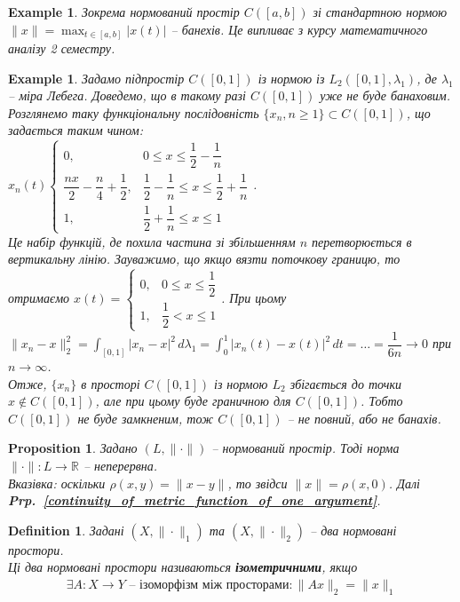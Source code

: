 \documentclass[a4paper, 10pt]{article}
\theoremstyle{theoremdd}
\theoremstyle{theoremdd}
\newtheorem{definition}[theorem]{Definition}
\theoremstyle{theoremdd}
\theoremstyle{theoremdd}
\newtheorem{example}[theorem]{Example}
\theoremstyle{theoremdd}
\newtheorem{proposition}[theorem]{Proposition}
\theoremstyle{theoremdd}
\theoremstyle{theoremdd}
\theoremstyle{theoremdd}
\newcommand\prpref[1]{\textbf{Prp.~\ref{#1}}}
\begin{document}
\begin{example}
Зокрема нормований простір $C([a,b])$ зі стандартною нормою $\|x\| = \displaystyle\max_{t \in [a,b]} |x(t)|$ -- банехів. Це випливає з курсу математичного аналізу 2 семестру.
\end{example}

\begin{example}
Задамо підпростір $C([0,1])$ із нормою із $L_2([0,1],\lambda_1)$, де $\lambda_1$ -- міра Лебега. Доведемо, що в такому разі $C([0,1])$ уже не буде банаховим.\\
Розглянемо таку функціональну послідовність $\{x_n,n \geq 1\} \subset C([0,1])$, що задається таким чином:\\
$x_n(t) \begin{cases}
0, & 0 \leq x \leq \dfrac{1}{2} - \dfrac{1}{n} \\
\dfrac{nx}{2} - \dfrac{n}{4} + \dfrac{1}{2}, & \dfrac{1}{2} - \dfrac{1}{n} \leq x \leq \dfrac{1}{2} + \dfrac{1}{n} \\
1, & \dfrac{1}{2} + \dfrac{1}{n} \leq x \leq 1
\end{cases}$.\\
Це набір функцій, де похила частина зі збільшенням $n$ перетворюється в вертикальну лінію. Зауважимо, що якщо вязти поточкову границю, то отримаємо $x(t) = \begin{cases} 0, & 0 \leq x \leq \dfrac{1}{2} \\1, & \dfrac{1}{2} < x \leq 1 \end{cases}$. При цьому\\
$\|x_n - x\|_2^2 = \displaystyle\int_{[0,1]} |x_n-x|^2\,d\lambda_1 = \int_0^1 |x_n(t)-x(t)|^2\,dt = \dots = \dfrac{1}{6n} \to 0$ при $n \to \infty$.\\
Отже, $\{x_n\}$ в просторі $C([0,1])$ із нормою $L_2$ збігається до точки $x \notin C([0,1])$, але при цьому буде граничною для $C([0,1])$. Тобто $C([0,1])$ не буде замкненим, тож $C([0,1])$ -- не повний, або не банахів.
\end{example}

\begin{proposition}
Задано $(L, \|\cdot \|)$ -- нормований простір. Тоді норма $\| \cdot \| \colon L \to \mathbb{R}$ -- неперервна.\\
\textit{Вказівка: оскільки $\rho(x,y) = \|x-y\|$, то звідси $\|x\| = \rho(x,0)$. Далі \prpref{continuity_of_metric_function_of_one_argument}.}
\end{proposition}

\begin{definition}
Задані $(X,\|\cdot\|_1)$ та $(X,\|\cdot\|_2)$ -- два нормовані простори.\\
Ці два нормовані простори називаються \textbf{ізометричними}, якщо
\begin{align*}
\exists A \colon X \to Y \text{ -- ізоморфізм між просторами}: \|Ax\|_2 = \|x\|_1
\end{align*}
\end{definition}
\end{document}
